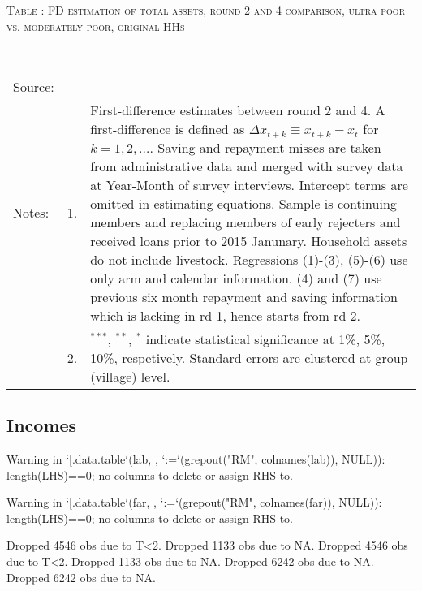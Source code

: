 \hspace{-1cm}\begin{minipage}[t]{14cm}
\hfil\textsc{\normalsize Table \thetable: FD estimation of total assets, round 2 and 4 comparison, ultra poor vs. moderately poor, original HHs \label{tab FD total assets rd24 poor original HHs}}\\
\setlength{\tabcolsep}{1pt}
\setlength{\baselineskip}{8pt}
\renewcommand{\arraystretch}{.55}
\hfil{}\\
\renewcommand{\arraystretch}{.8}
\setlength{\tabcolsep}{1pt}
\begin{tabular}{>{\hfill\scriptsize}p{1cm}<{}>{\hfill\scriptsize}p{.25cm}<{}>{\scriptsize}p{12cm}<{\hfill}}
Source:& \multicolumn{2}{l}{\scriptsize Estimated with GUK administrative and survey data.}\\
Notes: & 1. & First-difference estimates between round 2 and 4. A first-difference is defined as $\Delta x_{t+k}\equiv x_{t+k} - x_{t}$ for $k=1, 2, \dots$. Saving and repayment misses are taken from administrative data and merged with survey data at Year-Month of survey interviews. Intercept terms are omitted in estimating equations. Sample is continuing members and replacing members of early rejecters and received loans prior to 2015 Janunary. Household assets do not include livestock. Regressions (1)-(3), (5)-(6) use only arm and calendar information. (4) and (7) use previous six month repayment and saving information which is lacking in rd 1, hence starts from rd 2.\\
& 2. & ${}^{***}$, ${}^{**}$, ${}^{*}$ indicate statistical significance at 1\%, 5\%, 10\%, respetively. Standard errors are clustered at group (village) level.
\end{tabular}
\end{minipage}

\clearpage
\subsection{Incomes}



\begin{Schunk}
\begin{Soutput}
Warning in `[.data.table`(lab, , `:=`(grepout("RM", colnames(lab)), NULL)): length(LHS)==0; no columns to delete or assign RHS to.
\end{Soutput}
\begin{Soutput}
Warning in `[.data.table`(far, , `:=`(grepout("RM", colnames(far)), NULL)): length(LHS)==0; no columns to delete or assign RHS to.
\end{Soutput}
\begin{Soutput}
Dropped 4546 obs due to T<2.
Dropped 1133 obs due to NA.
Dropped 4546 obs due to T<2.
Dropped 1133 obs due to NA.
Dropped 6242 obs due to NA.
Dropped 6242 obs due to NA.
\end{Soutput}
\end{Schunk}


